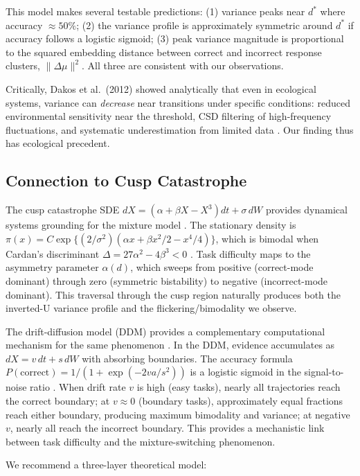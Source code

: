 \documentclass[11pt,letterpaper]{article}
\begin{document}
This model makes several testable predictions: (1) variance peaks near $d^*$ where accuracy $\approx 50\%$; (2) the variance profile is approximately symmetric around $d^*$ if accuracy follows a logistic sigmoid; (3) peak variance magnitude is proportional to the squared embedding distance between correct and incorrect response clusters, $\|\Delta\mu\|^2$. All three are consistent with our observations.

Critically, Dakos et al.~(2012) showed analytically that even in ecological systems, variance can \emph{decrease} near transitions under specific conditions: reduced environmental sensitivity near the threshold, CSD filtering of high-frequency fluctuations, and systematic underestimation from limited data \cite{dakos2012robustness}. Our finding thus has ecological precedent.

\subsection{Connection to Cusp Catastrophe}

The cusp catastrophe SDE $dX = (\alpha + \beta X - X^3)dt + \sigma\,dW$ provides dynamical systems grounding for the mixture model \cite{chen2022cusp}. The stationary density is $\pi(x) = C\exp\{(2/\sigma^2)(\alpha x + \beta x^2/2 - x^4/4)\}$, which is bimodal when Cardan's discriminant $\Delta = 27\alpha^2 - 4\beta^3 < 0$ \cite{chen2022cusp}. Task difficulty maps to the asymmetry parameter $\alpha(d)$, which sweeps from positive (correct-mode dominant) through zero (symmetric bistability) to negative (incorrect-mode dominant). This traversal through the cusp region naturally produces both the inverted-U variance profile and the flickering/bimodality we observe.

The drift-diffusion model (DDM) provides a complementary computational mechanism for the same phenomenon \cite{ratcliff2008}. In the DDM, evidence accumulates as $dX = v\,dt + s\,dW$ with absorbing boundaries. The accuracy formula $P(\text{correct}) = 1/(1 + \exp(-2va/s^2))$ is a logistic sigmoid in the signal-to-noise ratio \cite{ratcliff2008}. When drift rate $v$ is high (easy tasks), nearly all trajectories reach the correct boundary; at $v \approx 0$ (boundary tasks), approximately equal fractions reach either boundary, producing maximum bimodality and variance; at negative $v$, nearly all reach the incorrect boundary. This provides a mechanistic link between task difficulty and the mixture-switching phenomenon.

We recommend a three-layer theoretical model:
\end{document}
